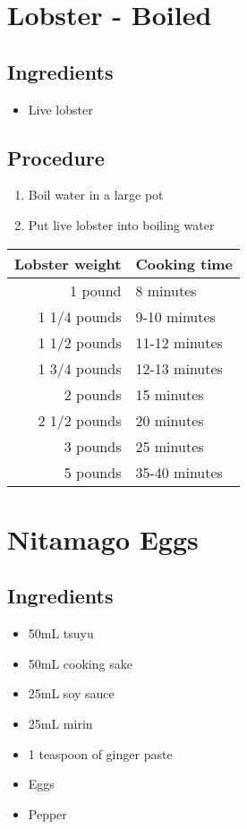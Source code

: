 \documentclass[10pt]{book}
\begin{document}

\newpage
\section*{Lobster - Boiled}
\subsection*{Ingredients}
	\begin{itemize}
		\item Live lobster
	\end{itemize}
\subsection*{Procedure}
	\begin{enumerate}
		\item Boil water in a large pot
		\item Put live lobster into boiling water
	\end{enumerate}
	
	\vspace{1cm}
	
	\begin{center}
	\begin{tabular}{r | l}
		Lobster weight & Cooking time\\
		\hline
		1 pound &	8 minutes\\
		1 1/4 pounds &	9-10 minutes\\
		1 1/2 pounds &	11-12 minutes\\
		1 3/4 pounds &	12-13 minutes\\
		2 pounds &	15 minutes\\
		2 1/2 pounds &	20 minutes\\
		3 pounds &	25 minutes\\
		5 pounds &	35-40 minutes\\
	\end{tabular}
	\end{center}
\newpage


\newpage
\section*{Nitamago Eggs}
\subsection*{Ingredients}
	\begin{itemize}
		\item 50mL tsuyu
		\item 50mL cooking sake
		\item 25mL soy sauce
		\item 25mL mirin
		\item 1 teaspoon of ginger paste
		\item Eggs
		\item Pepper
	\end{itemize}
\end{document}
